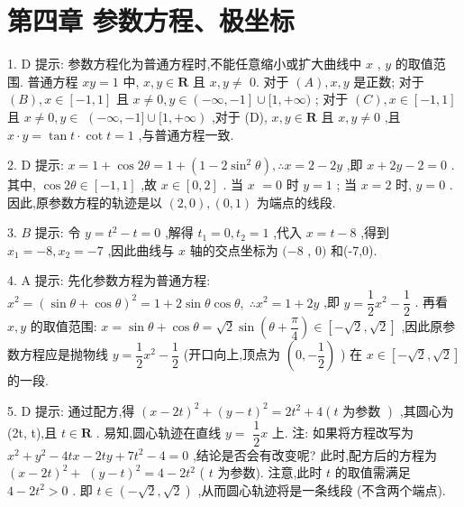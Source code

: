 \section*{第四章 参数方程、极坐标}

1. D 提示: 参数方程化为普通方程时,不能任意缩小或扩大曲线中 $x$ , $y$ 的取值范围. 普通方程 ${xy} = 1$ 中, $x,y \in  \mathbf{R}$ 且 $x,y \neq$ 0. 对于 $\left( A\right) ,x,y$ 是正数; 对于 $\left( B\right) ,x \in  \left\lbrack  {-1,1}\right\rbrack$ 且 $x \neq  0,y \in  \left( {-\infty , - 1}\right\rbrack   \cup  \lbrack 1, + \infty )$ ; 对于 $\left( C\right) ,x \in  \left\lbrack  {-1,1}\right\rbrack$ 且 $x \neq  0,y \in$  $\left( {-\infty , - 1\rbrack \cup \lbrack 1, + \infty }\right)$ ,对于 (D), $x,y \in  \mathbf{R}$ 且 $x,y \neq  0$ ,且 $x \cdot  y = \tan t \cdot  \cot t = 1$ ,与普通方程一致.

2. D 提示: $x = 1 + \cos {2\theta } = 1 + \left( {1 - 2{\sin }^{2}\theta }\right) ,\therefore x = 2 - {2y}$ ,即 $x + {2y} - 2 = 0$ . 其中, $\cos {2\theta } \in  \left\lbrack  {-1,1}\right\rbrack$ ,故 $x \in  \left\lbrack  {0,2}\right\rbrack$ . 当 $x$  $= 0$ 时 $y = 1$ ; 当 $x = 2$ 时, $y = 0$ . 因此,原参数方程的轨迹是以 $\left( {2,0}\right) ,\left( {0,1}\right)$ 为端点的线段.

3. $B$ 提示: 令 $y = {t}^{2} - t = 0$ ,解得 ${t}_{1} = 0,{t}_{2} = 1$ ,代入 $x = t - 8$ ,得到 ${x}_{1} =  - 8,{x}_{2} =  - 7$ ,因此曲线与 $x$ 轴的交点坐标为 $( - 8$ , $0)$ 和(-7,0).

4. A 提示: 先化参数方程为普通方程: ${x}^{2} = {\left( \sin \theta  + \cos \theta \right) }^{2} = 1 + 2\sin \theta \cos \theta ,\;\therefore {x}^{2} = 1 + {2y}$ ,即 $y = \dfrac{1}{2}{x}^{2} - \dfrac{1}{2}$ . 再看 $x,y$ 的取值范围: $x = \sin \theta  + \cos \theta  = \sqrt{2}\sin \left( {\theta  + \dfrac{\pi }{4}}\right)  \in  \left\lbrack  {-\sqrt{2},\sqrt{2}}\right\rbrack$ ,因此原参数方程应是抛物线 $y = \dfrac{1}{2}{x}^{2} - \dfrac{1}{2}$ (开口向上,顶点为 $\left( {0, - \dfrac{1}{2}}\right)$ ) 在 $x \in  \left\lbrack  {-\sqrt{2},\sqrt{2}}\right\rbrack$ 的一段.

5. D 提示: 通过配方,得 ${\left( x - 2t\right) }^{2} + {\left( y - t\right) }^{2} = 2{t}^{2} + 4\left( {t\text{ 为参数 }}\right)$ ,其圆心为(2t, t),且 $t \in  \mathbf{R}$ . 易知,圆心轨迹在直线 $y =$  $\dfrac{1}{2}x$ 上. 注: 如果将方程改写为 ${x}^{2} + {y}^{2} - {4tx} - {2ty} + 7{t}^{2} - 4 = 0$ ,结论是否会有改变呢? 此时,配方后的方程为 ${\left( x - 2t\right) }^{2} +$  ${\left( y - t\right) }^{2} = 4 - 2{t}^{2}$ ( $t$ 为参数). 注意,此时 $t$ 的取值需满足 $4 - 2{t}^{2} > 0$ . 即 $t \in  \left( {-\sqrt{2},\sqrt{2}}\right)$ ,从而圆心轨迹将是一条线段 (不含两个端点).

